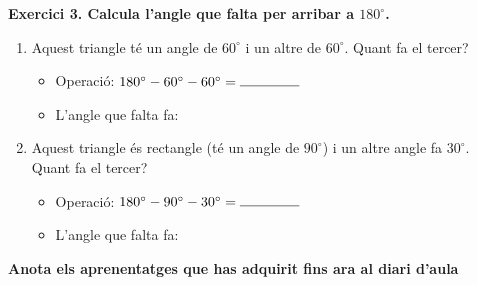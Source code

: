 \documentclass[12pt,a4paper]{article}
\begin{document}
\vspace{0.5cm}

\begin{center}
\end{center}

\textbf{Exercici 3. Calcula l'angle que falta per arribar a $180^\circ$.}

\begin{enumerate}
    \item Aquest triangle té un angle de $60^\circ$ i un altre de $60^\circ$. Quant fa el tercer?
    \begin{itemize}
        \item Operació: $180^\circ - 60^\circ - 60^\circ = \makebox[1.5cm]{\hrulefill}$
        \item L'angle que falta fa: \makebox[1.5cm]{\hrulefill}
    \end{itemize}
    \vspace{0.3cm}
    \item Aquest triangle és rectangle (té un angle de $90^\circ$) i un altre angle fa $30^\circ$. Quant fa el tercer?
    \begin{itemize}
        \item Operació: $180^\circ - 90^\circ - 30^\circ = \makebox[1.5cm]{\hrulefill}$
        \item L'angle que falta fa: \makebox[1.5cm]{\hrulefill}
    \end{itemize}
\end{enumerate}

\textbf{Anota els aprenentatges que has adquirit fins ara al diari d'aula}


\begin{center}
\end{center}
\end{document}

